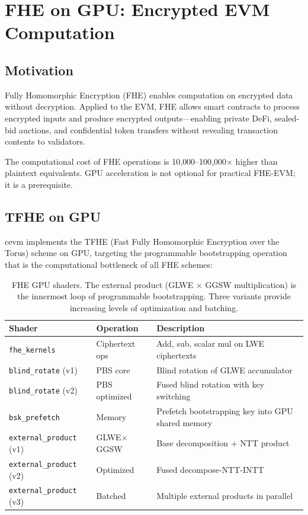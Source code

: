 \section{FHE on GPU: Encrypted EVM Computation}

\label{sec:fhe}

\subsection{Motivation}

Fully Homomorphic Encryption (FHE) enables computation on encrypted data without
decryption. Applied to the EVM, FHE allows smart contracts to process encrypted inputs
and produce encrypted outputs---enabling private DeFi, sealed-bid auctions, and
confidential token transfers without revealing transaction contents to validators.

The computational cost of FHE operations is 10{,}000--100{,}000$\times$ higher than
plaintext equivalents. GPU acceleration is not optional for practical FHE-EVM; it is
a prerequisite.

\subsection{TFHE on GPU}

cevm implements the TFHE (Fast Fully Homomorphic Encryption over the Torus) scheme
on GPU, targeting the programmable bootstrapping operation that is the computational
bottleneck of all FHE schemes:

\begin{table}[h]
\centering
\small
\begin{tabular}{llp{5.5cm}}
\toprule
\textbf{Shader} & \textbf{Operation} & \textbf{Description} \\
\midrule
\texttt{fhe\_kernels}        & Ciphertext ops  & Add, sub, scalar mul on LWE ciphertexts \\
\texttt{blind\_rotate} (v1)  & PBS core        & Blind rotation of GLWE accumulator \\
\texttt{blind\_rotate} (v2)  & PBS optimized   & Fused blind rotation with key switching \\
\texttt{bsk\_prefetch}       & Memory          & Prefetch bootstrapping key into GPU shared memory \\
\texttt{external\_product} (v1) & GLWE$\times$GGSW & Base decomposition + NTT product \\
\texttt{external\_product} (v2) & Optimized       & Fused decompose-NTT-INTT \\
\texttt{external\_product} (v3) & Batched         & Multiple external products in parallel \\
\bottomrule
\end{tabular}
\caption{FHE GPU shaders. The external product (GLWE $\times$ GGSW multiplication)
is the innermost loop of programmable bootstrapping. Three variants provide
increasing levels of optimization and batching.}
\label{tab:fhe}
\end{table}


